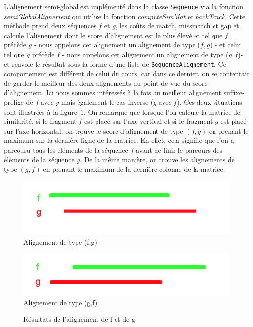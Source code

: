  L'alignement semi-global est implémenté dans la classe \verb|Sequence| via la fonction \emph{semiGlobalAlignement} qui utilise la fonction \emph{computeSimMat} et \emph{backTrack}. Cette méthode prend deux séquences $f$ et $g$, les coûts de match, missmatch et gap et calcule l'alignement dont le score d'alignement est le plus élevé et  tel que $f$ précède $g$ - nous appelons cet alignement un alignement de type ($f,g$) - et celui tel que $g$ précède $f$ - nous appelons cet alignement un alignement de type ($g,f$)- et renvoie le résultat sous la forme d'une liste de \verb|SequenceAlignement|. Ce comportement est différent de celui du cours, car dans ce dernier, on se contentait de garder le meilleur des deux alignements du point de vue du score d'alignement. Ici nous sommes intéressés à la fois  au meilleur alignement suffixe-prefixe de $f$ avec $g$ mais également le cas inverse ($g$ avec $f$). Ces deux situations sont illustrées à la figure~\ref{fig:alignementType}.
On remarque que lorsque l'on calcule la matrice de similarité, si le fragment $f$ est placé sur l'axe vertical et si le fragment $g$ est placé sur l'axe horizontal, on trouve le score d'alignement de type $(f,g)$ en prenant le maximum sur la dernière ligne de la matrice. En effet, cela signifie que l'on a parcouru tous les éléments de la séquence $f$ avant de finir le parcours des éléments de la séquence $g$. De la même manière, on trouve les alignements de type $(g,f)$ en prenant le maximum de la dernière colonne de la matrice.\\

\begin{figure}
	\begin{minipage}[r]{.46\linewidth}
		\begin{center}
		\includegraphics[scale= 0.50]{(f,g).png}
		Alignement de type (f,g)
	\end{center}
	   \end{minipage} \hfill
	   \begin{minipage}[c]{.46\linewidth}
		\begin{center}
			\includegraphics[scale= 0.50]{(g,f).png}
			Alignement de type (g,f)
		\end{center}
			  \end{minipage}
		\caption{Résultats de l'alignement de f et de g}
		\label{fig:alignementType}
\end{figure}


